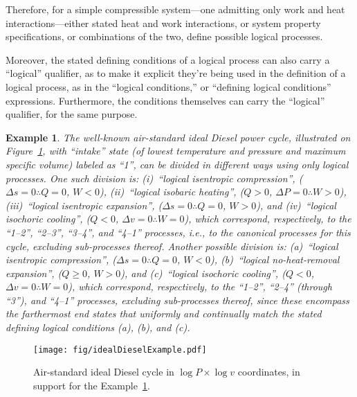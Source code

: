 \documentclass[fleqn,11pt]{SelfArx}
\newtheorem{example}{Example}
\begin{document}
    Therefore,  for  a  simple  compressible  system---one  admitting   only   work   and   heat
    interactions---either stated heat and work interactions, or system property  specifications,
    or combinations of the two, define possible logical processes.

    Moreover, the stated defining conditions of a logical process can also carry  a  ``logical''
    qualifier, as to make it explicit they're being used in the definition of a logical process,
    as  in  the  ``logical  conditions,''  or  ``defining  logical   conditions''   expressions.
    Furthermore, the conditions themselves can carry the ``logical''  qualifier,  for  the  same
    purpose.

    \begin{example}\label{ex:ideal.Diesel}
        The   well-known   air-standard   ideal   Diesel    power    cycle,    illustrated    on
        Figure~\ref{fig:cycle.Diesel}, with ``intake'' state (of lowest temperature and pressure
        and maximum specific volume) labeled as ``1'', can be divided in  different  ways  using
        only logical processes. One such division is:  (i)~``logical  isentropic  compression'',
        ($\Delta s\!=\!0 \therefore Q\!=\!0$, $W\!\!<\!0$), (ii)~``logical  isobaric  heating'',
        ($Q\!>\!0$,  $\Delta  P\!=\!0   \therefore   W\!\!>\!0$),   (iii)~``logical   isentropic
        expansion'', ($\Delta s\!=\!0  \therefore  Q\!=\!0$,  $W\!\!>\!0$),  and  (iv)~``logical
        isochoric  cooling'',  ($Q\!<\!0$,  $\Delta  v\!=\!0   \therefore   W\!\!=\!0$),   which
        correspond, respectively, to the ``1--2'', ``2--3'', ``3--4'', and  ``4--1''  processes,
        i.e., to the canonical  processes  for  this  cycle,  excluding  sub-processes  thereof.
        Another possible division is: (a)~``logical isentropic compression'',  ($\Delta  s\!=\!0
        \therefore   Q\!=\!0$,   $W\!\!<\!0$),   (b)~``logical   no-heat-removal    expansion'',
        ($Q\!\geqslant\!0$, $W\!\!>\!0$), and  (c)~``logical  isochoric  cooling'',  ($Q\!<\!0$,
        $\Delta v\!=\!0 \therefore W\!\!=\!0$), which correspond, respectively, to the ``1--2'',
        ``2--4'' (through ``3''), and ``4--1'' processes, excluding sub-processes thereof, since
        these encompass the farthermost end states that  uniformly  and  continually  match  the
        stated defining logical conditions (a), (b), and (c).
    \end{example}

    \begin{figure}[ht]
        \centering
        \texttt{[image: fig/idealDieselExample.pdf]}
        \caption{Air-standard ideal Diesel cycle in $\log  P  \times  \log  v$  coordinates,  in
            support for the Example~\ref{ex:ideal.Diesel}.}
        \label{fig:cycle.Diesel}
    \end{figure}
\end{document}
